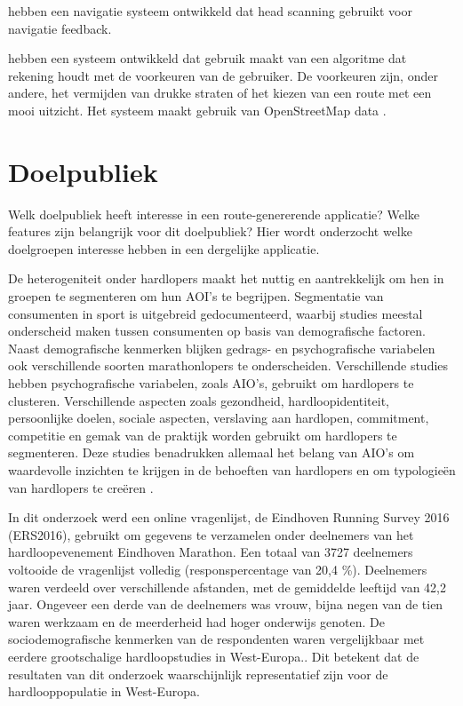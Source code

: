     \textcite{Gallo2020} hebben een navigatie systeem ontwikkeld dat head scanning gebruikt voor navigatie feedback.

    \textcite{Novack2018} hebben een systeem ontwikkeld dat gebruik maakt van een algoritme dat rekening houdt met de voorkeuren van de gebruiker.
    De voorkeuren zijn, onder andere, het vermijden van drukke straten of het kiezen van een route met een mooi uitzicht.
    Het systeem maakt gebruik van OpenStreetMap data \autocite{Novack2018}.

    \section{Doelpubliek}

    Welk doelpubliek heeft interesse in een route-genererende applicatie? Welke features zijn belangrijk voor dit doelpubliek?
    Hier wordt onderzocht welke doelgroepen interesse hebben in een dergelijke applicatie.

    De heterogeniteit onder hardlopers maakt het nuttig en aantrekkelijk om hen in groepen te segmenteren om hun AOI's te begrijpen. 
    Segmentatie van consumenten in sport is uitgebreid gedocumenteerd, waarbij studies meestal onderscheid maken tussen consumenten 
    op basis van demografische factoren. Naast demografische kenmerken blijken gedrags- en psychografische variabelen ook 
    verschillende soorten marathonlopers te onderscheiden. Verschillende studies hebben psychografische variabelen, zoals AIO's, 
    gebruikt om hardlopers te clusteren. Verschillende aspecten zoals gezondheid, hardloopidentiteit, persoonlijke doelen, sociale aspecten, 
    verslaving aan hardlopen, commitment, competitie en gemak van de praktijk worden gebruikt om hardlopers te segmenteren.
    Deze studies benadrukken allemaal het belang van AIO's om waardevolle inzichten te krijgen in de behoeften van hardlopers 
    en om typologieën van hardlopers te creëren \textcite{Janssen2020}. 

    In dit onderzoek werd een online vragenlijst, de Eindhoven Running Survey 2016 (ERS2016), 
    gebruikt om gegevens te verzamelen onder deelnemers van het hardloopevenement Eindhoven Marathon. 
    Een totaal van 3727 deelnemers voltooide de vragenlijst volledig (responspercentage van 20,4 \%). 
    Deelnemers waren verdeeld over verschillende afstanden, met de gemiddelde leeftijd van 42,2 jaar. 
    Ongeveer een derde van de deelnemers was vrouw, bijna negen van de tien waren werkzaam en de meerderheid had hoger onderwijs genoten. 
    De sociodemografische kenmerken van de respondenten waren vergelijkbaar met eerdere grootschalige hardloopstudies in West-Europa.\textcite{Janssen2020}.
    Dit betekent dat de resultaten van dit onderzoek waarschijnlijk representatief zijn voor de hardlooppopulatie in West-Europa.

